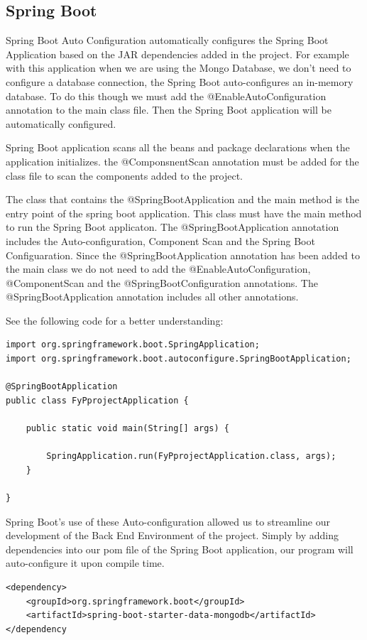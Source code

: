 \subsection{Spring Boot}
Spring Boot Auto Configuration automatically configures the Spring Boot Application based on the JAR dependencies added in the project. For example with this application when we are using the Mongo Database, we don't need to configure a database connection, the Spring Boot auto-configures an in-memory database. To do this though we must add the @EnableAutoConfiguration annotation to the main class file. Then the Spring Boot application will be automatically configured.\par
Spring Boot application scans all the beans and package declarations when the application initializes. the @ComponsnentScan annotation must be added for the class file to scan the components added to the project. \par
The class that contains the @SpringBootApplication and the main method is the entry point of the spring boot application. This class must have the main method to run the Spring Boot applicaton. The @SpringBootApplication annotation includes the Auto-configuration, Component Scan and the Spring Boot Configuaration. Since the @SpringBootApplication annotation has been added to the main class we do not need to add the @EnableAutoConfiguration, @ComponentScan and the @SpringBootConfiguration annotations. The @SpringBootApplication annotation includes all other annotations. \par
See the following code for a better understanding:
\begin{verbatim}
import org.springframework.boot.SpringApplication;
import org.springframework.boot.autoconfigure.SpringBootApplication;

@SpringBootApplication
public class FyPprojectApplication {

	public static void main(String[] args) {

		SpringApplication.run(FyPprojectApplication.class, args);
	}

}
\end{verbatim}
Spring Boot's use of these Auto-configuration allowed us to streamline our development of the Back End Environment of the project. Simply by adding dependencies into our pom file of the Spring Boot application, our program will auto-configure it upon compile time. \par
\begin{verbatim}
<dependency>
	<groupId>org.springframework.boot</groupId>
	<artifactId>spring-boot-starter-data-mongodb</artifactId>
</dependency
\end{verbatim}
\cite{TutorialsPoint}

